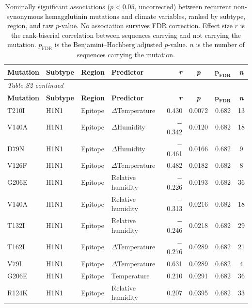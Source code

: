 \documentclass[11pt, a4paper]{article}
\begin{document}
\begin{longtable}{llllrccc}
    \caption{Nominally significant associations ($p < 0.05$, uncorrected) between recurrent non-synonymous hemagglutinin mutations and climate variables, ranked by subtype, region, and raw $p$-value. No association survives FDR correction. Effect size $r$ is the rank-biserial correlation between sequences carrying and not carrying the mutation. $p_{\text{FDR}}$ is the Benjamini--Hochberg adjusted $p$-value. $n$ is the number of sequences carrying the mutation.}
    \label{tab:s3_mutations} \\
    \toprule
    \textbf{Mutation} & \textbf{Subtype} & \textbf{Region} & \textbf{Predictor} & \textbf{\textit{r}} & \textbf{\textit{p}} & $\boldsymbol{p_{\text{FDR}}}$ & \textbf{\textit{n}} \\
    \midrule
    \endfirsthead
    \multicolumn{8}{l}{\small\textit{Table S2 continued}} \\
    \toprule
    \textbf{Mutation} & \textbf{Subtype} & \textbf{Region} & \textbf{Predictor} & \textbf{\textit{r}} & \textbf{\textit{p}} & $\boldsymbol{p_{\text{FDR}}}$ & \textbf{\textit{n}} \\
    \midrule
    \endhead
    \bottomrule
    \endlastfoot
        T210I & H1N1 & Epitope & $\Delta$Temperature & 0.430 & 0.0072 & 0.682 & 13 \\
        V140A & H1N1 & Epitope & $\Delta$Humidity & $-$0.342 & 0.0120 & 0.682 & 18 \\
        D79N & H1N1 & Epitope & $\Delta$Humidity & $-$0.461 & 0.0166 & 0.682 & 9 \\
        V126F & H1N1 & Epitope & $\Delta$Temperature & 0.482 & 0.0182 & 0.682 & 8 \\
        G206E & H1N1 & Epitope & Relative humidity & $-$0.226 & 0.0193 & 0.682 & 36 \\
        V140A & H1N1 & Epitope & Relative humidity & $-$0.313 & 0.0216 & 0.682 & 18 \\
        T132I & H1N1 & Epitope & Relative humidity & $-$0.246 & 0.0218 & 0.682 & 29 \\
        T162I & H1N1 & Epitope & $\Delta$Temperature & $-$0.276 & 0.0289 & 0.682 & 21 \\
        V79I & H1N1 & Epitope & $\Delta$Temperature & 0.631 & 0.0289 & 0.682 & 4 \\
        G206E & H1N1 & Epitope & Temperature & 0.210 & 0.0291 & 0.682 & 36 \\
        R124K & H1N1 & Epitope & Relative humidity & 0.207 & 0.0395 & 0.682 & 33 \\

\end{longtable}
\end{document}
